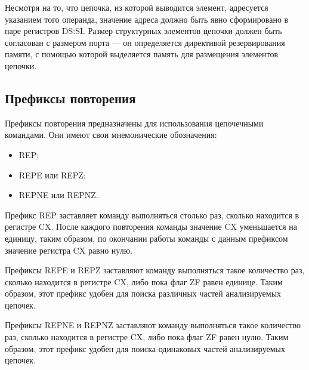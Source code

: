 Несмотря на то, что цепочка, из которой выводится элемент, адресуется указанием
того операнда, значение адреса должно быть явно сформировано в паре регистров
DS:SI. Размер структурных элементов цепочки должен быть согласован
с размером порта --- он определяется директивой резервирования памяти, 
с помощью которой выделяется память для размещения элементов цепочки.

\subsection{Префиксы повторения}

Префиксы повторения предназначены для использования цепочечными командами.
Они имеют свои мнемонические обозначения:
\begin{itemize}
\item REP;
\item REPE или REPZ;
\item REPNE или REPNZ.
\end{itemize}

Префикс REP заставляет команду выполняться столько раз, сколько находится 
в регистре CX. После каждого повторения команды значение CX уменьшается на единицу, таким
образом, по окончании работы команды с данным префиксом значение регистра CX равно нулю.

Префиксы REPE и REPZ заставляют команду выполняться такое количество раз, сколько находится 
в регистре CX, либо пока флаг ZF равен единице. Таким образом, этот префикс удобен для поиска 
различных частей анализируемых цепочек.

Префиксы REPNE и REPNZ заставляют команду выполняться такое количество раз, сколько находится 
в регистре CX, либо пока флаг ZF равен нулю. Таким образом, этот префикс удобен для поиска 
одинаковых частей анализируемых цепочек.